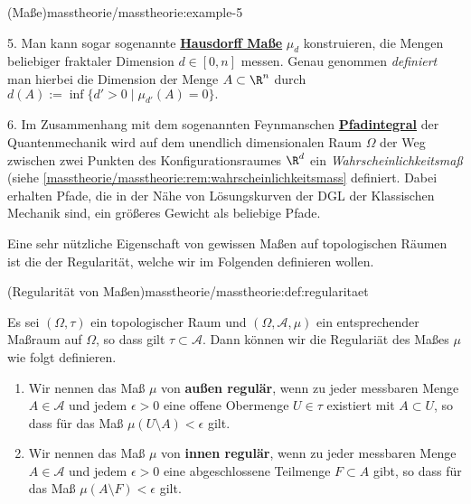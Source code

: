 \documentclass[letterpaper,10pt,english]{jupyterBook}
\begin{document}
\begin{example}{(Maße)}{masstheorie/masstheorie:example-5}
\par
5. Man kann sogar sogenannte \href{https://de.wikipedia.org/wiki/Hausdorff-Ma\%c3\%9f}{\textbf{Hausdorff Maße}} \(\mu_d\) konstruieren, die Mengen beliebiger fraktaler Dimension \(d\in[0,n]\) messen.
Genau genommen \emph{definiert} man hierbei die Dimension der Menge \(A\subset \R^n\) durch \(d(A):=\inf\{d'>0\mid \mu_{d'}(A)=0\}.\)

\par
6. Im Zusammenhang mit dem sogenannten Feynmanschen \href{https://de.wikipedia.org/wiki/Pfadintegral}{\textbf{Pfadintegral}} der Quantenmechanik wird auf dem unendlich dimensionalen Raum \(\Omega\) der Weg zwischen zwei Punkten des Konfigurationsraumes \(\R^d\) ein \emph{Wahrscheinlichkeitsmaß} (siehe \cref{masstheorie/masstheorie:rem:wahrscheinlichkeitsmass}  definiert.
Dabei erhalten Pfade, die in der Nähe von Lösungskurven der DGL der Klassischen Mechanik sind, ein größeres Gewicht als beliebige Pfade.
\end{example}

\par
Eine sehr nützliche Eigenschaft von gewissen Maßen auf topologischen Räumen ist die der Regularität, welche wir im Folgenden definieren wollen.
\begin{definition}{(Regularität von Maßen)}{masstheorie/masstheorie:def:regularitaet}



\par
Es sei \((\Omega, \tau)\) ein topologischer Raum und \((\Omega, \mathcal{A}, \mu)\) ein entsprechender Maßraum auf \(\Omega\), so dass gilt \(\tau \subset \mathcal{A}\).
Dann können wir die Regulariät des Maßes \(\mu\) wie folgt definieren.
\begin{enumerate}

\item {} 
\par
Wir nennen das Maß \(\mu\) von \textbf{außen regulär}, wenn zu jeder messbaren Menge \(A \in \mathcal{A}\) und jedem \(\epsilon > 0\) eine offene Obermenge \(U \in \tau\) existiert mit \(A \subset U\), so dass für das Maß \(\mu(U\setminus A) < \epsilon\) gilt.

\item {} 
\par
Wir nennen das Maß \(\mu\) von \textbf{innen regulär}, wenn zu jeder messbaren Menge \(A \in \mathcal{A}\) und jedem \(\epsilon > 0\) eine abgeschlossene Teilmenge \(F \subset A\) gibt, so dass für das Maß \(\mu(A\setminus F) < \epsilon\) gilt.

\end{enumerate}
\end{definition}
\end{document}

